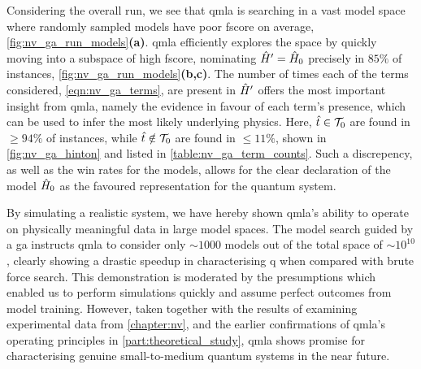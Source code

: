 Considering the overall \gls{run}, 
    we see that \gls{qmla} is searching in a vast \gls{model space} where randomly sampled models
    have poor \gls{fscore} on average, \cref{fig:nv_ga_run_models}\textbf{(a)}. 
\gls{qmla} efficiently explores the space by quickly moving into a 
    subspace of high \gls{fscore}, nominating $\hat{H}^{\prime} = \hat{H}_0$ precisely in $85\%$ of instances,
    \cref{fig:nv_ga_run_models}\textbf{(b,c)}.
The number of times each of the terms considered, \cref{eqn:nv_ga_terms}, 
    are present in $\hat{H}^{\prime}$ offers the most important insight from \gls{qmla}, 
    namely the evidence in favour of each term's presence, 
    which can be used to infer the most likely underlying physics. 
Here, $\hat{t} \in \mathcal{T}_0$ are found in $\geq 94\%$ of instances, 
    while $\hat{t} \notin \mathcal{T}_0$ are found in $\leq 11\%$, 
    shown in \cref{fig:nv_ga_hinton} and listed in \cref{table:nv_ga_term_counts}.
Such a discrepency, as well as the \glspl{win rate} for the models, 
    allows for the clear declaration of the model $\hat{H}_0$ as the favoured representation 
    for the quantum system. 
\par 

By simulating a realistic system, we have hereby shown \gls{qmla}'s ability to operate on physically meaningful data
    in large \glspl{model space}. 
The \gls{model search} guided by a \gls{ga} instructs \gls{qmla} to consider only $\sim1000$ models out of the 
    total space of $\sim10^{10}$, 
    clearly showing a drastic speedup in characterising \gls{q} when compared with brute force search.
This demonstration is moderated by the presumptions which enabled us to perform simulations quickly
    and assume perfect outcomes from model training. 
However, taken together with the results of examining experimental data from \cref{chapter:nv}, 
    and the earlier confirmations of \gls{qmla}'s operating principles in \cref{part:theoretical_study}, 
    \gls{qmla} shows promise for characterising genuine small-to-medium quantum systems in the near future. 

